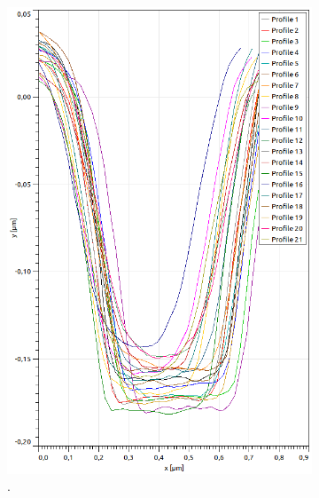 \begin{figure}[H]
\begin{subfigure}[t]{0.3\textwidth}
	\includegraphics[width=\textwidth]{AFM_auswertung/cd_tiefe_grafik.png}
	\caption{.}
	\label{abb:}
	\end{subfigure}
	~
	\begin{subfigure}[t]{0.3\textwidth}

\end{subfigure}
\end{figure}
